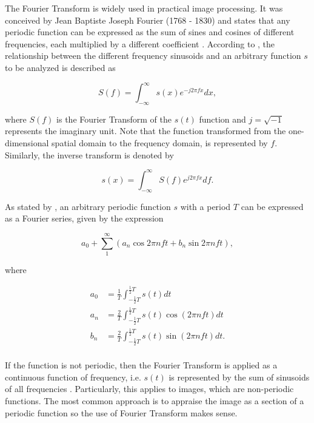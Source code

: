 The Fourier Transform is widely used in practical image processing. It was conceived by Jean Baptiste Joseph Fourier (1768 - 1830) and states that any periodic function can be expressed as the sum of sines and cosines of different frequencies, each multiplied by a different coefficient \cite{gonzalez2018digital}. According to , the relationship between the different frequency sinusoids and an arbitrary function $s$ to be analyzed is described as

\begin{equation}
\label{eqn:fourier_transform}
S(f) = \int_{-\infty}^{\infty}s(x)e^{-j 2 \pi f x} dx,
\end{equation}

\noindent where $S(f)$ is the Fourier Transform of the $s(t)$ function and $j = \sqrt{-1}$ represents the imaginary unit. Note that the function transformed from the one-dimensional spatial domain to the frequency domain, is represented by $f$. Similarly, the inverse transform is denoted by

\begin{equation}
\label{eqn:inverse_fourier_transform}
s(x) = \int_{-\infty}^{\infty}S(f)e^{j 2 \pi f x} df.
\end{equation}

As stated by , an arbitrary periodic function $s$ with a period $T$ can be expressed as a Fourier series, given by the expression

\begin{equation}
\label{eqn:fourier_series}
a_{0} + \sum_{1}^{\infty} (a_{n} \cos{2 \pi n f t} + b_{n} \sin{2 \pi n f t}),
\end{equation}

\noindent where

\begin{align*}
a_{0} &= \frac{1}{T} \int_{-\frac{1}{2} T}^{\frac{1}{2} T} s(t) dt\\
a_{n} &= \frac{2}{T} \int_{-\frac{1}{2} T}^{\frac{1}{2} T} s(t) \cos{(2 \pi n f t)} dt\\
b_{n} &= \frac{2}{T} \int_{-\frac{1}{2} T}^{\frac{1}{2} T} s(t) \sin{(2 \pi n f t)} dt.\\
\end{align*}

If the function is not periodic, then the Fourier Transform is applied as a continuous function of frequency, i.e. $s(t)$ is represented by the sum of sinusoids of all frequencies \cite{brigham1988fast}. Particularly, this applies to images, which are non-periodic functions. The most common approach is to appraise the image as a section of a periodic function so the use of Fourier Transform makes sense.

